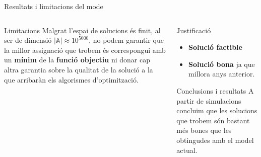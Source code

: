 \documentclass[twocolumn]{beamer}
\begin{document}
\begin{frame}{Resultats i limitacions del mode}
\begin{columns}[t]
	\begin{column}{.5\textwidth}
		\begin{block}{Limitacions}
			Malgrat l'espai de solucions és finit, al ser de dimensió $|\mathbb{A}|\approx10^{5000}$, no podem garantir que la millor assignació que trobem és correspongui amb un  \textbf{mínim} de la \textbf{funció objectiu} ni donar cap altra garantia sobre la qualitat de la solució a la que arribaràn els algorismes d'optimització.
		\end{block}
		
	\end{column}
	\begin{column}{.5\textwidth}
		
		\begin{block}{Justificació}
			\begin{itemize}
				\item \textbf{Solució factible}
				\item \textbf{Solució bona} ja que millora anys anterior.
			\end{itemize}
		\end{block}
		\begin{block}{Conclusions i resultats}
			A partir de simulacions concluïm que les solucions que trobem són bastant més bones que les obtingudes amb el model actual.
		\end{block}
	\end{column}
\end{columns}
\end{frame}
\end{document}
